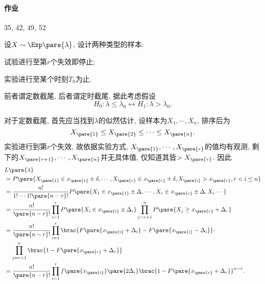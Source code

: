 \documentclass[../Statistics.tex]{subfiles}
\begin{document}
\paragraph{作业} %
\label{par:作业}

35, 42, 49, 52



\begin{sample}
\begin{ex}[截尾试验]
    设$X\sim \Exp\pare{\lambda}$, 设计两种类型的样本:
    \begin{cenum}
        \item 试验进行至第$r$个失效即停止;
        \item 实验进行至某个时刻$T_0$为止.
    \end{cenum}
    前者谓定数截尾, 后者谓定时截尾. 据此考虑假设
    \[ H_0: \lambda \le \lambda_0 \leftrightarrow H_1: \lambda > \lambda_0. \]
    \begin{cenum}
        \item 对于定数截尾, 首先应当找到$\lambda$的似然估计, 设样本为$X_1,\cdots,X_n$, 排序后为
        \[ X_{\pare{1}} \le X_{\pare{2}} \le\cdots \le X_{\pare{n}}. \]
        实验进行到第$r$个失效, 故依据实验方式, $X_{\pare{1}},\cdots,X_{\pare{r}}$的值均有观测, 剩下的$X_{\pare{r+1}},\cdots,X_{\pare{n}}$并无具体值, 仅知道其皆$>X_{\pare{r}}$. 因此
        \begin{align*}
            & L\pare{\lambda} \\ &= P\pare{X_{\pare{1}} \in x_{\pare{1}}\pm\delta,\cdots,X_{\pare{r}}\in x_{\pare{r}}\pm\delta,X_{\pare{i}}>x_{\pare{r}}, r<i\le n} \\
            &= \frac{n!}{1!\cdots 1!\pare{n-r}!}P\pare{X_1\in x_{\pare{1}}\pm\Delta,\cdots,X_r\in x_{\pare{r}}\pm \Delta, X_i \cdots} \\
            &= \frac{n!}{\pare{n-r}!} \prod_{i=1}^r P\pare{X_i\in x_{\pare{i}}\pm \Delta_i} \prod_{j=r+1}^n P\pare{X_j \ge x_{\pare{r}} + \Delta_r} \\
            &= \frac{n!}{\pare{n-r}!}\prod_{i=1}^r \brac{F\pare{x_{\pare{i}}+\Delta_i} - F\pare{x_{\pare{i}}-\Delta_i}}\cdot \\ &\phantom{=}\ \prod_{j=r+1}^n \brac{1-F\pare{x_{\pare{r}} + \Delta_r}} \\
            &= \frac{n!}{\pare{n-r}!}\prod_{i=1}^r f\pare{x_{\pare{i}}}\pare{2\Delta_i}\brac{1-F\pare{x_{\pare{r}}+\Delta_r}}^{n-r}.
        \end{align*}

\end{cenum}
\end{ex}
\end{sample}
\end{document}
